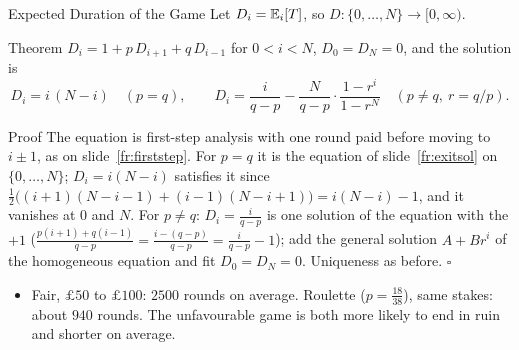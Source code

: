 \begin{frame}{Expected Duration of the Game}
  \label{fr:duration}
  \small
  Let $D_i=\mathbb{E}_i[T]$, so $D\colon\{0,\dots,N\}\to[0,\infty)$.
  \begin{block}{Theorem}
    $D_i=1+p\,D_{i+1}+q\,D_{i-1}$ for $0<i<N$, $D_0=D_N=0$, and the solution is
    \[
      D_i=i\,(N-i)\quad(p=q),\qquad
      D_i=\frac{i}{q-p}-\frac{N}{q-p}\cdot\frac{1-r^i}{1-r^N}\quad(p\ne q,\ r=q/p).
    \]
  \end{block}
  \begin{block}{Proof}
    The equation is first-step analysis with one round paid before moving to $i\pm1$, as on slide~\ref{fr:firststep}. For $p=q$ it is the equation of slide~\ref{fr:exitsol} on $\{0,\dots,N\}$; $D_i=i(N-i)$ satisfies it since $\tfrac12\big((i+1)(N-i-1)+(i-1)(N-i+1)\big)=i(N-i)-1$, and it vanishes at $0$ and $N$.
    For $p\ne q$: $D_i=\tfrac{i}{q-p}$ is one solution of the equation with the $+1$ ($\tfrac{p(i+1)+q(i-1)}{q-p}=\tfrac{i-(q-p)}{q-p}=\tfrac i{q-p}-1$); add the general solution $A+Br^i$ of the homogeneous equation and fit $D_0=D_N=0$. Uniqueness as before. \hfill$\square$
  \end{block}
  \begin{itemize}
    \item Fair, $\pounds50$ to $\pounds100$: $2500$ rounds on average. Roulette ($p=\tfrac{18}{38}$), same stakes: about $940$ rounds. The unfavourable game is both more likely to end in ruin and shorter on average.
  \end{itemize}
\end{frame}


